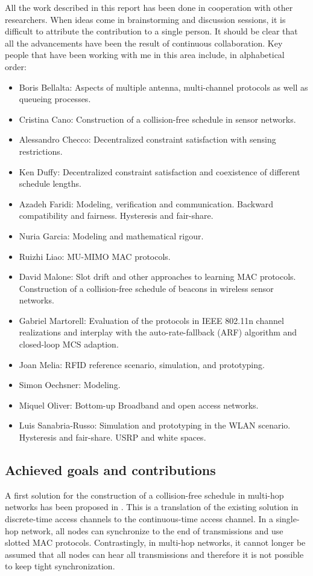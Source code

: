 \documentclass[a4paper,twocolumns]{article}%
\begin{document}
All the work described in this report has been done in cooperation with other researchers.
When ideas come in brainstorming and discussion sessions, it is difficult to attribute the contribution to a single person.
It should be clear that all the advancements have been the result of continuous collaboration.
Key people that have been working with me in this area include, in alphabetical order:
\begin{itemize}
\item Boris Bellalta: Aspects of multiple antenna, multi-channel protocols as well as queueing processes.
\item Cristina Cano: Construction of a collision-free schedule in sensor networks.
\item Alessandro Checco: Decentralized constraint satisfaction with sensing restrictions.
\item Ken Duffy: Decentralized constraint satisfaction and coexistence of different schedule lengths.
\item Azadeh Faridi: Modeling, verification and communication. Backward compatibility and fairness. Hysteresis and fair-share.
\item Nuria Garcia: Modeling and mathematical rigour.
\item Ruizhi Liao: MU-MIMO MAC protocols.
\item David Malone: Slot drift and other approaches to learning MAC protocols. Construction of a collision-free schedule of beacons in wireless sensor networks.
\item Gabriel Martorell: Evaluation of the protocols in IEEE 802.11n channel realizations and interplay with the auto-rate-fallback (ARF) algorithm and closed-loop MCS adaption.
\item Joan Melia: RFID reference scenario, simulation, and prototyping.
\item Simon Oechsner: Modeling.
\item Miquel Oliver: Bottom-up Broadband and open access networks.
\item Luis Sanabria-Russo: Simulation and prototyping in the WLAN scenario. Hysteresis and fair-share. USRP and white spaces.
\end{itemize}

\subsection{Achieved goals and contributions}

A first solution for the construction of a collision-free schedule in multi-hop networks has been proposed in \cite{barcelo2013dcc}.
This is a translation of the existing solution in discrete-time access channels to the continuous-time access channel.
In a single-hop network, all nodes can synchronize to the end of transmissions and use slotted MAC protocols.
Contrastingly, in multi-hop networks, it cannot longer be assumed that all nodes can hear all transmissions and therefore it is not possible to keep tight synchronization.
\end{document}
